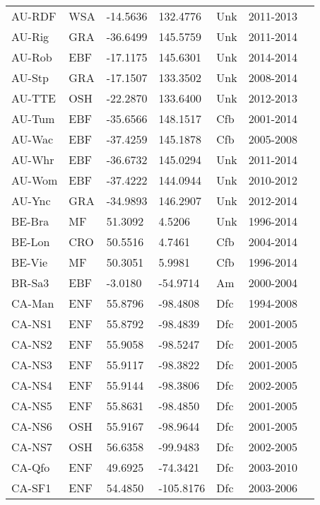 \documentclass[a4paper, 12pt]{article}
\begin{document}
\begin{longtable}{l l l l l l l}
AU-RDF & WSA & -14.5636 & 132.4776 & Unk & 2011-2013 & \cite{AU-RDF} \\
AU-Rig & GRA & -36.6499 & 145.5759 & Unk & 2011-2014 & \cite{AU-Rig} \\
AU-Rob & EBF & -17.1175 & 145.6301 & Unk & 2014-2014 & \cite{AU-Rob} \\
AU-Stp & GRA & -17.1507 & 133.3502 & Unk & 2008-2014 & \cite{AU-Stp} \\
AU-TTE & OSH & -22.2870 & 133.6400 & Unk & 2012-2013 & \cite{AU-TTE} \\
AU-Tum & EBF & -35.6566 & 148.1517 & Cfb & 2001-2014 & \cite{AU-Tum} \\
AU-Wac & EBF & -37.4259 & 145.1878 & Cfb & 2005-2008 & \cite{AU-Wac} \\
AU-Whr & EBF & -36.6732 & 145.0294 & Unk & 2011-2014 & \cite{AU-Whr} \\
AU-Wom & EBF & -37.4222 & 144.0944 & Unk & 2010-2012 & \cite{AU-Wom} \\
AU-Ync & GRA & -34.9893 & 146.2907 & Unk & 2012-2014 & \cite{AU-Ync} \\
BE-Bra & MF & 51.3092 & 4.5206 & Unk & 1996-2014 & \cite{BE-Bra} \\
BE-Lon & CRO & 50.5516 & 4.7461 & Cfb & 2004-2014 & \cite{BE-Lon} \\
BE-Vie & MF & 50.3051 & 5.9981 & Cfb & 1996-2014 & \cite{BE-Vie} \\
BR-Sa3 & EBF & -3.0180 & -54.9714 & Am & 2000-2004 & \cite{BR-Sa3} \\
CA-Man & ENF & 55.8796 & -98.4808 & Dfc & 1994-2008 & \cite{CA-Man} \\
CA-NS1 & ENF & 55.8792 & -98.4839 & Dfc & 2001-2005 & \cite{CA-NS1} \\
CA-NS2 & ENF & 55.9058 & -98.5247 & Dfc & 2001-2005 & \cite{CA-NS2} \\
CA-NS3 & ENF & 55.9117 & -98.3822 & Dfc & 2001-2005 & \cite{CA-NS3} \\
CA-NS4 & ENF & 55.9144 & -98.3806 & Dfc & 2002-2005 & \cite{CA-NS4} \\
CA-NS5 & ENF & 55.8631 & -98.4850 & Dfc & 2001-2005 & \cite{CA-NS5} \\
CA-NS6 & OSH & 55.9167 & -98.9644 & Dfc & 2001-2005 & \cite{CA-NS6} \\
CA-NS7 & OSH & 56.6358 & -99.9483 & Dfc & 2002-2005 & \cite{CA-NS7} \\
CA-Qfo & ENF & 49.6925 & -74.3421 & Dfc & 2003-2010 & \cite{CA-Qfo} \\
CA-SF1 & ENF & 54.4850 & -105.8176 & Dfc & 2003-2006 & \cite{CA-SF1} \\

\end{longtable}
\end{document}
